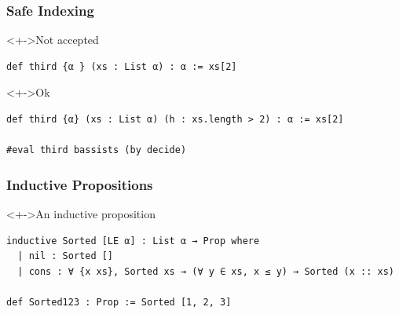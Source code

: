 \documentclass{beamer}
\begin{document}
\begin{frame}
  \frametitle{Safe Indexing}
  \begin{alertblock}<+->{Not accepted}
\begin{lstlisting}
def third {α } (xs : List α) : α := xs[2]
\end{lstlisting}
  \end{alertblock}

  \begin{exampleblock}<+->{Ok}
\begin{lstlisting}
def third {α} (xs : List α) (h : xs.length > 2) : α := xs[2]

#eval third bassists (by decide)
\end{lstlisting}
  \end{exampleblock}
\end{frame}
\begin{frame}[fragile]
 \frametitle{Inductive Propositions}
  \begin{block}<+->{An inductive proposition}
\begin{lstlisting}
inductive Sorted [LE α] : List α → Prop where
  | nil : Sorted []
  | cons : ∀ {x xs}, Sorted xs → (∀ y ∈ xs, x ≤ y) → Sorted (x :: xs)

def Sorted123 : Prop := Sorted [1, 2, 3]
\end{lstlisting}
  \end{block}
\end{frame}
\end{document}
